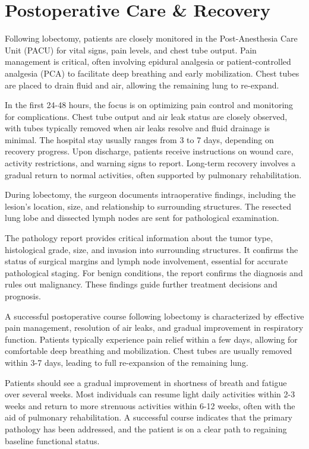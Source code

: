 \section*{Postoperative Care \& Recovery}
Following lobectomy, patients are closely monitored in the Post-Anesthesia Care Unit (PACU) for vital signs, pain levels, and chest tube output. Pain management is critical, often involving epidural analgesia or patient-controlled analgesia (PCA) to facilitate deep breathing and early mobilization. Chest tubes are placed to drain fluid and air, allowing the remaining lung to re-expand.

In the first 24-48 hours, the focus is on optimizing pain control and monitoring for complications. Chest tube output and air leak status are closely observed, with tubes typically removed when air leaks resolve and fluid drainage is minimal. The hospital stay usually ranges from 3 to 7 days, depending on recovery progress. Upon discharge, patients receive instructions on wound care, activity restrictions, and warning signs to report. Long-term recovery involves a gradual return to normal activities, often supported by pulmonary rehabilitation.

During lobectomy, the surgeon documents intraoperative findings, including the lesion's location, size, and relationship to surrounding structures. The resected lung lobe and dissected lymph nodes are sent for pathological examination.

The pathology report provides critical information about the tumor type, histological grade, size, and invasion into surrounding structures. It confirms the status of surgical margins and lymph node involvement, essential for accurate pathological staging. For benign conditions, the report confirms the diagnosis and rules out malignancy. These findings guide further treatment decisions and prognosis.

A successful postoperative course following lobectomy is characterized by effective pain management, resolution of air leaks, and gradual improvement in respiratory function. Patients typically experience pain relief within a few days, allowing for comfortable deep breathing and mobilization. Chest tubes are usually removed within 3-7 days, leading to full re-expansion of the remaining lung.

Patients should see a gradual improvement in shortness of breath and fatigue over several weeks. Most individuals can resume light daily activities within 2-3 weeks and return to more strenuous activities within 6-12 weeks, often with the aid of pulmonary rehabilitation. A successful course indicates that the primary pathology has been addressed, and the patient is on a clear path to regaining baseline functional status.


